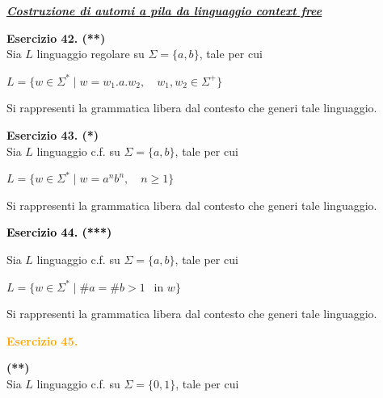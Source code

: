 \documentclass[a4paper,10pt]{article}
\begin{document}
{\normalsize
\begin{itemize}[label=, leftmargin=0pt]

\item \underline{\textit{\textbf{Costruzione di automi a pila da linguaggio context free}}}
    
    \item {} \textbf{Esercizio 42. (**)}\\ 
    Sia $L$ linguaggio regolare su $\Sigma=\{a,b\}$, tale per cui 
    {\begin{center}
        $L = \{ w\in \Sigma^* \mid w=w_1.a.w_2,\quad w_1, w_2\in \Sigma^+\}$\\
    \end{center}}
    Si rappresenti la grammatica libera dal contesto che generi tale linguaggio.\\
    
    
    \item {} \textbf{Esercizio 43. (*)}\\ 
    Sia $L$ linguaggio c.f. su $\Sigma=\{a,b\}$, tale per cui 
    {\begin{center}
        $L = \{ w\in \Sigma^* \mid w=a^nb^n,\quad n\geq1\}$\\
    \end{center}}
    Si rappresenti la grammatica libera dal contesto che generi tale linguaggio.
    
    

     \textcolor{black}{\item \textbf{Esercizio 44. (***)}\\ }
    Sia $L$ linguaggio c.f. su $\Sigma=\{a,b\}$, tale per cui 
    {\begin{center}
        $L = \{ w\in \Sigma^* \mid \#a = \#b >1\ \  \text{\ in\ }w \}$\\
    \end{center}} 
    Si rappresenti la grammatica libera dal contesto che generi tale linguaggio.

 
    \textcolor{orange}{\item \textbf{Esercizio 45. }}\textbf{(**)}\\ 
    Sia $L$ linguaggio c.f. su $\Sigma=\{0,1\}$, tale per cui 

    {
  \small
    \begin{center}
\end{center}}
\end{itemize}}
\end{document}
